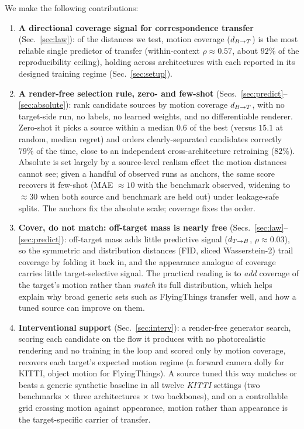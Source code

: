 We make the following contributions:
\begin{enumerate}
\item \textbf{A directional coverage signal for correspondence transfer}
  (Sec.~\ref{sec:law}): of the distances we test, motion coverage ($d_{B\to T}$) is the
  most reliable single predictor of transfer (within-context $\rho{\approx}0.57$,
  about $92\%$ of the reproducibility ceiling), holding across architectures with
  each reported in its designed training regime (Sec.~\ref{sec:setup}).
\item \textbf{A render-free selection rule, zero- and few-shot}
  (Secs.~\ref{sec:predict}--\ref{sec:absolute}): rank candidate sources by motion
  coverage $d_{B\to T}$, with no target-side run, no labels, no learned weights, and no
  differentiable renderer. Zero-shot it picks a source within a median $0.6$
  \pck{} of the best (versus $15.1$ at random, median regret) and orders
  clearly-separated candidates correctly $79\%$ of the time, close to an
  independent cross-architecture retraining ($82\%$). Absolute \pck{} is set
  largely by a source-level realism effect the motion distances cannot see; given
  a handful of observed runs as anchors, the same score recovers it few-shot (MAE
  ${\approx}10$ with the benchmark observed, widening to ${\approx}30$ when both
  source and benchmark are held out) under leakage-safe splits. The anchors fix the absolute scale; coverage fixes the order.
\item \textbf{Cover, do not match: off-target mass is nearly free}
  (Secs.~\ref{sec:law}--\ref{sec:predict}): off-target mass adds little predictive
  signal ($d_{T\to B}$, $\rho{\approx}0.03$), so the symmetric and distribution
  distances (FID, sliced Wasserstein-2) trail coverage by folding it back in, and
  the appearance analogue of coverage carries little target-selective signal. The
  practical reading is to \emph{add} coverage of the target's motion rather than
  \emph{match} its full distribution, which helps explain why broad generic sets
  such as FlyingThings transfer well, and how a tuned source can improve on them.
\item \textbf{Interventional support} (Sec.~\ref{sec:interv}): a render-free
  generator search, scoring each candidate on the flow it produces with no
  photorealistic rendering and no training in the loop and scored only by motion
  coverage, recovers each target's expected motion regime (a forward camera dolly
  for KITTI, object motion for FlyingThings). A source tuned this way matches or
  beats a generic synthetic baseline in all twelve \emph{KITTI} settings (two
  benchmarks $\times$ three architectures $\times$ two backbones), and on a
  controllable grid crossing motion against appearance, motion rather than
  appearance is the target-specific carrier of transfer.
\end{enumerate}


